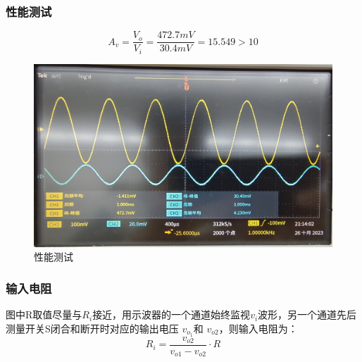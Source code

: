 \documentclass[a4paper]{article}
\theoremstyle{definition}
\theoremstyle{plain}
\theoremstyle{remark}
\begin{document}
\subsubsection{性能测试}
\begin{equation}
	A_v  = \frac{V_o}{V_i} =\frac{472.7mV}{30.4mV}=15.549 > 10
\end{equation}
\begin{figure}[H]
	\centering
	\includegraphics[width=1\textwidth]{性能测试}
	\caption{性能测试}
	\label{性能测试}
\end{figure}

\subsubsection{输入电阻}
图中R取值尽量与$R_i$接近，用示波器的一个通道始终监视$v_i$波形，另一个通道先后测量开关S闭合和断开时对应的输出电压 $v_{o_1}$和 $v_{o2}$，则输入电阻为：
\begin{equation}
	R_i = \frac{v_{o2}}{v_{o1}-v_{o2}} \cdot R
\end{equation}
\end{document}
